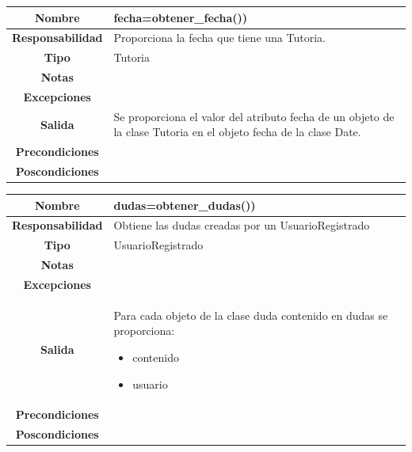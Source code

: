                        \begin{table}[!ht]
\begin{tabular}{|c|m{10cm}|}
\hline\rowcolor{Gray}
{\bf Nombre } & {fecha=obtener\_fecha())}\\
\hline
{\bf Responsabilidad } & {Proporciona la fecha que tiene una Tutoria.}\\
\hline
\rowcolor{Gray}
{\bf Tipo } & {Tutoria} \\
\hline
{\bf Notas } & { } \\
\hline
\rowcolor{Gray}
{\bf Excepciones }& {
} \\
\hline
{\bf Salida }& 
	  { Se proporciona el valor del atributo fecha de un objeto de la clase Tutoria  en el objeto fecha de la clase Date.
} 
 \\
\hline
\rowcolor{Gray}
{\bf Precondiciones }& {
}\\
\hline
{\bf Poscondiciones }& { 
  }
  \\
\hline
\end{tabular}

\end{table}





                       \begin{table}[!ht]
\begin{tabular}{|c|m{10cm}|}
\hline\rowcolor{Gray}
{\bf Nombre } & {dudas=obtener\_dudas())}\\
\hline
{\bf Responsabilidad } & {Obtiene las dudas creadas por un UsuarioRegistrado}\\
\hline
\rowcolor{Gray}
{\bf Tipo } & {UsuarioRegistrado} \\
\hline
{\bf Notas } & { } \\
\hline
\rowcolor{Gray}
{\bf Excepciones }& {
} \\
\hline
{\bf Salida }& 
	  { Para cada objeto de la clase duda contenido en dudas se proporciona:
	  \begin{itemize}
	  \item contenido
	  \item usuario
	  \end{itemize}
} 
 \\
\hline
\rowcolor{Gray}
{\bf Precondiciones }& {
}\\
\hline
{\bf Poscondiciones }& { 
  }
  \\
\hline
\end{tabular}

\end{table}





